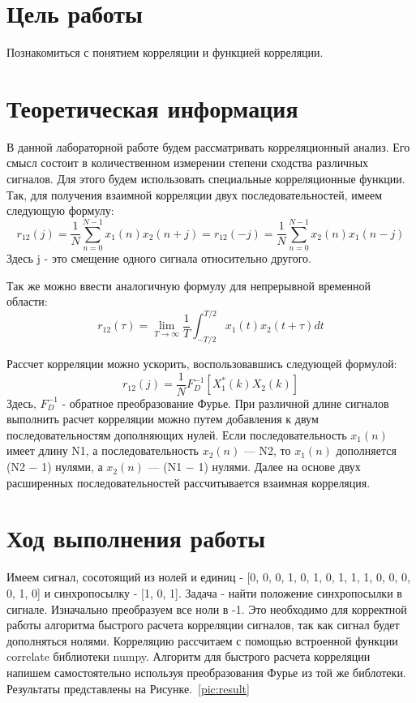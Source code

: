 
\usepackage{amsmath}







\section{Цель работы}
Познакомиться с понятием корреляции и функцией корреляции. 


\section{Теоретическая информация}
В данной лабораторной работе будем рассматривать корреляционный анализ. Его смысл состоит в количественном измерении степени сходства различных сигналов. Для этого будем использовать специальные корреляционные функции. Так, для получения взаимной корреляции двух последовательностей, имеем следующую формулу:
\begin{equation} r_{12}(j) = \frac{1}{N} \sum\limits_{n = 0}^{N - 1} x_1(n) x_2(n + j) = r_{12}(-j) =  \frac{1}{N} \sum\limits_{n = 0}^{N - 1} x_2(n) x_1(n - j) \end{equation}
Здесь j - это смещение одного сигнала относительно другого.

Так же можно ввести аналогичную формулу для непрерывной временной области:
\begin{equation} r_{12}(\tau) =  \lim_{T \to \infty} \frac{1}{T} \int_{-T/2}^{T/2} x_1(t)x_2(t + \tau) dt  \end{equation}

Рассчет корреляции можно ускорить, воспользовавшись следующей формулой:
\begin{equation} r_{12}(j) = \frac{1}{N}F_D^{-1}[X_1^*(k)X_2(k)] \end{equation}
Здесь, $F_D^{-1}$ - обратное преобразование Фурье.
При различной длине сигналов выполнить расчет корреляции можно путем добавления к двум последовательностям дополняющих нулей. Если последовательность $x_1(n)$ имеет
длину N1, а последовательность $x_2(n)$ — N2, то $x_1(n)$ дополняется (N2 − 1) нулями,
а $x_2(n)$ — (N1 − 1) нулями. Далее на основе двух расширенных последовательностей
рассчитывается взаимная корреляция.

\section{Ход выполнения работы}
Имеем сигнал, сосотоящий из нолей и единиц - [0, 0, 0, 1, 0, 1, 0, 1, 1, 1, 0, 0, 0, 0, 1, 0] и синхропосылку - [1, 0, 1]. Задача - найти положение синхропосылки в сигнале. Изначально преобразуем все ноли в -1. Это необходимо для корректной работы алгоритма быстрого расчета корреляции сигналов, так как сигнал будет дополняться нолями. Корреляцию рассчитаем с помощью встроенной функции correlate библиотеки numpy. Алгоритм для быстрого расчета корреляции напишем самостоятельно используя преобразования Фурье из той же библотеки. Результаты представлены на Рисунке.~\ref{pic:result}

